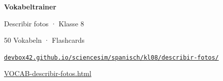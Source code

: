 \documentclass[a4paper]{article}
\begin{document}
\begin{center}

\vspace*{2cm}

{\Huge\bfseries\textcolor{spanisch}{Vokabeltrainer}}

\vspace{0.5cm}

{\Large Describir fotos · Klasse 8}

\vspace{0.3cm}

{\normalsize 50 Vokabeln · Flashcards}

\vspace{2cm}

\href{https://devbox42.github.io/sciencesim/spanisch/kl08/describir-fotos/VOCAB-describir-fotos.html}{}

\vspace{1.5cm}

\href{https://devbox42.github.io/sciencesim/spanisch/kl08/describir-fotos/VOCAB-describir-fotos.html}{\large\texttt{devbox42.github.io/sciencesim/spanisch/kl08/describir-fotos/}}

\vspace{0.5cm}

\href{https://devbox42.github.io/sciencesim/spanisch/kl08/describir-fotos/VOCAB-describir-fotos.html}{\normalsize VOCAB-describir-fotos.html}

\end{center}
\end{document}
